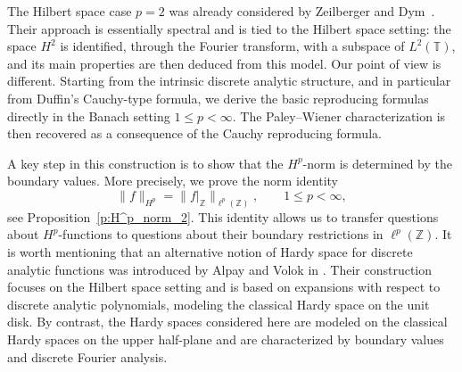 \documentclass[12pt,a4paper,reqno]{amsart}
\theoremstyle{definition}
\theoremstyle{definition}\newtheorem{defn}[thm]{Definition}
\newcommand{\nb}[3]{{\colorbox{#2}{\bfseries\sffamily\scriptsize\textcolor{white}{#1}}} 
    {\textcolor{#2}{\sf\small\textit{#3}}}}
\newcommand{\eug}[1]{\nb{Eug}{jazzberryjam}{#1}}
\begin{document}
    The Hilbert space case $p=2$ was already considered by Zeilberger and 
    Dym~\cite{ZD}. Their approach is essentially spectral and is tied to the Hilbert space setting: the space $H^2$ is 
    identified, through the Fourier transform, with a subspace of $L^2(\mathbb T)$, 
    and its %
    main properties are then deduced from this model. Our point of view is different. Starting from the intrinsic discrete analytic
    structure, and in particular from Duffin's Cauchy-type formula, we derive the
    basic reproducing formulas directly in the Banach setting
    $1\leqslant p<\infty$. The Paley--Wiener characterization is then recovered 
    as a consequence of the Cauchy reproducing formula.
    
    A key step in this construction is to show that the $H^p$-norm is determined by the boundary values. More precisely, we prove the norm identity
    \begin{equation}\label{eq:norm_boundary_identity}
    \|f\|_{H^p}
    =
    \|f|_{\mathbb Z}\|_{\ell^p(\mathbb Z)},
    \qquad 1\leqslant p<\infty,
    \end{equation}
    see Proposition~\ref{p:H^p_norm_2}. This identity allows us to transfer questions about $H^p$-functions to questions
    about their boundary restrictions in $\ell^p(\mathbb Z)$.   
    It is worth mentioning that an alternative notion of Hardy space for discrete analytic functions was introduced by Alpay and Volok in \cite{AV}. Their construction focuses on the Hilbert space setting and is based on expansions with respect to discrete analytic polynomials, modeling the classical Hardy space on the unit disk. By contrast, the Hardy spaces considered here are modeled on the classical Hardy spaces on the upper half-plane and are characterized by boundary values and discrete Fourier analysis.
    
\end{document}
